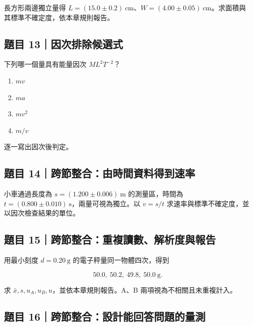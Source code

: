 \documentclass[11pt,a4paper]{article}
\providecommand{\tightlist}{%
  \setlength{\itemsep}{0pt}\setlength{\parskip}{0pt}}
\begin{document}
長方形兩邊獨立量得 \(L=(15.0\pm0.2)\ \mathrm{cm}\)、\(W=(4.00\pm0.05)\ \mathrm{cm}\)。求面積與其標準不確定度，依本章規則報告。

\subsection{題目 13｜因次排除候選式}\label{ux984cux76ee-13ux56e0ux6b21ux6392ux9664ux5019ux9078ux5f0f}

下列哪一個量具有能量因次 \(ML^2T^{-2}\)？

\begin{enumerate}
\def\labelenumi{\arabic{enumi}.}
\tightlist
\item
  \(mv\)
\item
  \(ma\)
\item
  \(mv^2\)
\item
  \(m/v\)
\end{enumerate}

逐一寫出因次後判定。

\subsection{題目 14｜跨節整合：由時間資料得到速率}\label{ux984cux76ee-14ux8de8ux7bc0ux6574ux5408ux7531ux6642ux9593ux8cc7ux6599ux5f97ux5230ux901fux7387}

小車通過長度為 \(s=(1.200\pm0.006)\ \mathrm{m}\) 的測量區，時間為 \(t=(0.800\pm0.010)\ \mathrm{s}\)，兩量可視為獨立。以 \(v=s/t\) 求速率與標準不確定度，並以因次檢查結果的單位。

\subsection{題目 15｜跨節整合：重複讀數、解析度與報告}\label{ux984cux76ee-15ux8de8ux7bc0ux6574ux5408ux91cdux8907ux8b80ux6578ux89e3ux6790ux5ea6ux8207ux5831ux544a}

用最小刻度 \(d=0.20\ \mathrm{g}\) 的電子秤量同一物體四次，得到

\[
50.0,\ 50.2,\ 49.8,\ 50.0\ \mathrm{g}.
\]

求 \(\bar x,s,u_A,u_B,u\)，並依本章規則報告。A、B 兩項視為不相關且未重複計入。

\subsection{題目 16｜跨節整合：設計能回答問題的量測}\label{ux984cux76ee-16ux8de8ux7bc0ux6574ux5408ux8a2dux8a08ux80fdux56deux7b54ux554fux984cux7684ux91cfux6e2c}
\end{document}
